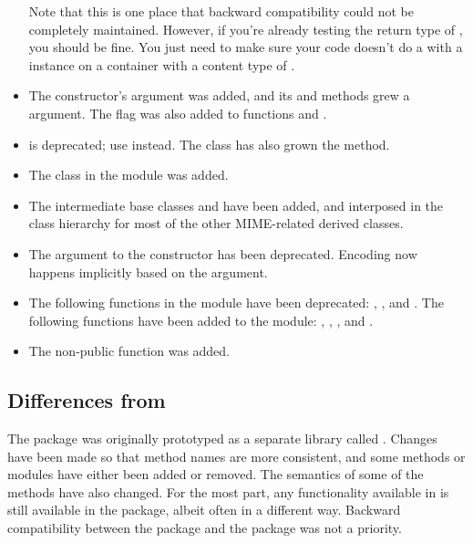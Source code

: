 \begin{itemize}
      Note that this is one place that backward compatibility could
      not be completely maintained.  However, if you're already
      testing the return type of , you should be
      fine.  You just need to make sure your code doesn't do a
       with a  instance on a
      container with a content type of .
\item The  constructor's  argument was
      added, and its  and  methods
      grew a  argument.  The  flag was
      also added to functions 
      and .
\item {} is deprecated; use
       instead.  The 
      class has also grown the  method.
\item The  class in the
       module was added.
\item The intermediate base classes  and
       have been added, and interposed in the
      class hierarchy for most of the other MIME-related derived
      classes.
\item The  argument to the  constructor
      has been deprecated.  Encoding  now happens implicitly based
      on the  argument.
\item The following functions in the  module have
      been deprecated: ,
      , and .  The following
      functions have been added to the module:
      , ,
      , and .
\item The non-public function 
      was added.
\end{itemize}

\subsection{Differences from }

The  package was originally prototyped as a separate
library called
.
Changes have been made so that
method names are more consistent, and some methods or modules have
either been added or removed.  The semantics of some of the methods
have also changed.  For the most part, any functionality available in
 is still available in the  package,
albeit often in a different way.  Backward compatibility between
the  package and the  package was not a
priority.

